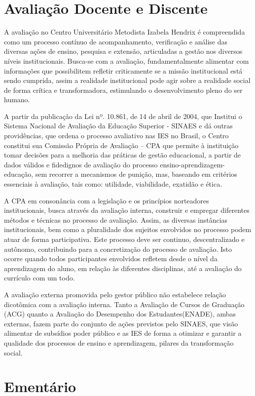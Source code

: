 \documentclass[a4paper, 12pt, openright, oneside, german, french, english, brazil]{abntex2}
\begin{document}
\chapter{Avaliação Docente e Discente}

A avaliação no Centro Universitário Metodista Izabela Hendrix é compreendida como um processo contínuo de acompanhamento, verificação e análise das diversas ações de ensino, pesquisa e extensão, articuladas a gestão nos diversos níveis institucionais. Busca-se com a avaliação, fundamentalmente alimentar com informações que possibilitem refletir criticamente se a missão institucional está sendo cumprida, assim a realidade institucional pode agir sobre a realidade social de forma crítica e transformadora, estimulando o desenvolvimento pleno do ser humano.

A partir da publicação da Lei nº. 10.861, de 14 de abril de 2004, que Institui o Sistema Nacional de Avaliação da Educação Superior - SINAES e dá outras providências, que ordena o processo avaliativo nas IES no Brasil, o Centro constitui sua Comissão Própria de Avaliação – CPA que permite à instituição tomar decisões para a melhoria das práticas de gestão educacional, a partir de dados válidos e fidedignos de avaliação do processo ensino-aprendizagem-educação, sem recorrer a mecanismos de punição, mas, baseando em critérios essenciais à avaliação, tais como: utilidade, viabilidade, exatidão e ética.

A CPA em consonância com a legislação e os princípios norteadores institucionais, busca através da avaliação interna, construir e empregar diferentes métodos e técnicas no processo de avaliação. Assim, as diversas instâncias institucionais, bem como a pluralidade dos sujeitos envolvidos no processo podem atuar de forma participativa. Este processo deve ser continuo, descentralizado e autônomo, contribuindo para a concretização do processo de avaliação. Isto ocorre quando todos participantes envolvidos refletem desde o nível da aprendizagem do aluno, em relação às diferentes disciplinas, até a avaliação do currículo com um todo.

A avaliação externa promovida pelo gestor público não estabelece relação dicotômica com a avaliação interna. Tanto a Avaliação de Cursos de Graduação (ACG) quanto a Avaliação do Desempenho dos Estudantes(ENADE), ambas externas, fazem parte do conjunto de ações previstos pelo SINAES, que visão alimentar de subsídios poder público e as IES de forma a otimizar e garantir a qualidade dos processos de ensino e aprendizagem, pilares da transformação social.


\chapter{Ementário}
\end{document}
